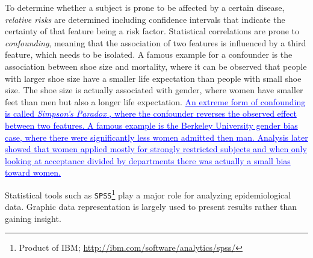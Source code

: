 \documentclass[journal]{style/vgtc} 			          %
\newcommand{\add}[1]{\textcolor{blue}{\uline{#1}}}
\begin{document}
%
To determine whether a subject is prone to be affected by a certain disease, \emph{relative risks} are determined including confidence intervals that indicate the certainty of that feature being a risk factor.
%
Statistical correlations are prone to \emph{confounding}, meaning that the association of two features is influenced by a third feature, which needs to be isolated.
%
A famous example for a confounder is the association between shoe size and mortality, where it can be observed that people with larger shoe size have a smaller life expectation than people with small shoe size.
%
The shoe size is actually associated with gender, where women have smaller feet than men but also a longer life expectation.
%
\add{An extreme form of confounding is called \emph{Simpson's Paradox} \cite{SimpsonsParadox}, where the confounder reverses the observed effect between two features.
%
A famous example is the Berkeley University gender bias case, where there were significantly less women admitted then man.
%
Analysis later showed that women applied mostly for strongly restricted subjects and when only looking at acceptance divided by departments there was actually a small bias toward women.
%
}

Statistical tools such as \texttt{SPSS}\footnote{Product of IBM; \url{http://ibm.com/software/analytics/spss/}} play a major role for analyzing epidemiological data.
%
Graphic data representation is largely used to present results rather than gaining insight.
	
\end{document}
